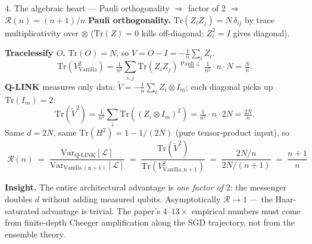 \documentclass[10pt, aspectratio=169]{beamer}
\newcommand{\insight}[1]{\textbf{\textcolor{ours}{Insight.}} #1}
\begin{document}
\begin{frame}{4. The algebraic heart — Pauli orthogonality $\Rightarrow$ factor of 2 $\Rightarrow$ $\mathcal{R}(n) = (n+1)/n$}
    \scriptsize
    \textbf{Pauli orthogonality.} \;$\mathrm{Tr}(Z_i Z_j) = N\,\delta_{ij}$ by trace multiplicativity over $\otimes$ ($\mathrm{Tr}(Z) = 0$ kills off-diagonal; $Z_i^2 = I$ gives diagonal).

    \textbf{Tracelessify $O$.} \;$\mathrm{Tr}(O) = N$, so $V = O - I = -\tfrac{1}{n}\sum_i Z_i$.
    \[
        \mathrm{Tr}(V_{\mathrm{Vanilla}}^2) = \tfrac{1}{n^2}\sum_{i,j} \mathrm{Tr}(Z_i Z_j) \stackrel{\mathrm{Pauli}\perp}{=} \tfrac{1}{n^2} \cdot n \cdot N = \tfrac{N}{n}.
    \]
    \textbf{Q-LINK} measures only data: $\tilde V = -\tfrac{1}{n}\sum_i Z_i \otimes I_m$; each diagonal picks up $\mathrm{Tr}(I_m) = 2$:
    \[
        \mathrm{Tr}(\tilde V^2) = \tfrac{1}{n^2}\sum_i \mathrm{Tr}((Z_i \otimes I_m)^2) = \tfrac{1}{n^2}\cdot n\cdot 2N = \tfrac{2N}{n}.
    \]
    Same $d = 2N$, same $\mathrm{Tr}(H^2) = 1 - 1/(2N)$ (pure tensor-product input), so
    \[
        \boxed{\;\mathcal{R}(n) \;=\; \frac{\mathrm{Var}_{\mathrm{Q\text{-}LINK}}[\mathcal{L}]}{\mathrm{Var}_{\mathrm{Vanilla\,(n+1)}}[\mathcal{L}]} \;=\; \frac{\mathrm{Tr}(\tilde V^2)}{\mathrm{Tr}(V_{\mathrm{Vanilla, n+1}}^2)} \;=\; \frac{2N/n}{2N/(n+1)} \;=\; \frac{n+1}{n}\;}
    \]

    \insight{The entire architectural advantage is \emph{one factor of $2$}: the messenger doubles
    $d$ without adding measured qubits. Asymptotically $\mathcal{R} \to 1$ — the Haar-saturated
    advantage is trivial. The paper's $4\text{--}13\times$ empirical numbers must come from finite-depth
    Cheeger amplification along the SGD trajectory, not from the ensemble theory.}
\end{frame}
\end{document}
